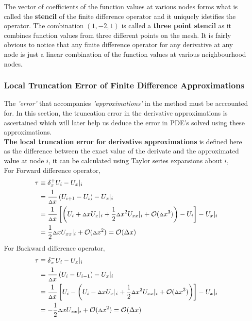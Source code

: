 The vector of coefficients of the function values at various nodes forms what is called the \textbf{stencil} of the finite difference operator and it uniquely idetifies the operator. The combination $(1,-2,1)$ is called a \textbf{three point stencil} as it combines function values from three different points on the mesh.
It is fairly obvious to notice that any finite difference operator for any derivative at any node is just a linear combination of the function values at various neighbourhood nodes.   

\subsubsection{Local Truncation Error of Finite Difference Approximations}
The \textit{'error'} that accompanies \textit{'approximations'} in the method must be acccounted for. In this section, the truncation error in the derivative approximations is ascertained which will later help us deduce the error in PDE's solved using these approximations.
\\[2mm]
\textbf{The local truncation error for derivative approximations} is defined here as the difference between the exact value of the derivate and the approximated value at node $i$, it can be calculated using Taylor series expansions about $i$,\\[2mm]
For Forward difference operator, 
\begin{align*}
    \tau &\equiv \delta _ x^{+} U_ i - {U_ x}|_ i \\
    &= \frac{1}{{\scriptstyle \Delta} x}\left( U_ {i+1} - U_{i}\right) - {U_ x}|_i \\
    &= \frac{1}{{\scriptstyle \Delta} x}\left[ \left( U_ i + {\scriptstyle \Delta} x{U_ x}|_ i + \frac{1}{2}{\scriptstyle \Delta} x^2{U_{xx}}|_ i + \mathcal{O}({\scriptstyle \Delta} x^3)\right) - U_i \right] - {U_ x}|_ i \\
    &= \frac{1}{2}{\scriptstyle \Delta} x{U_{xx}}|_ i + \mathcal{O}({\scriptstyle \Delta} x^2) = \mathcal{O}(\Delta x)
\end{align*}
For Backward difference operator, 
\begin{align*}
    \tau &\equiv \delta _ x^{-} U_ i - {U_ x}|_ i \\
    &= \frac{1}{{\scriptstyle \Delta} x}\left( U_ i - U_{i-1}\right) - {U_ x}|_i \\
    &= \frac{1}{{\scriptstyle \Delta} x}\left[ U_ i - \left( U_ i - {\scriptstyle \Delta} x{U_ x}|_ i + \frac{1}{2}{\scriptstyle \Delta} x^2{U_{xx}}|_ i + \mathcal{O}({\scriptstyle \Delta} x^3)\right)\right] - {U_ x}|_ i \\
    &= -\frac{1}{2}{\scriptstyle \Delta} x{U_{xx}}|_ i + \mathcal{O}({\scriptstyle \Delta} x^2) = \mathcal{O}(\Delta x)  
\end{align*}
